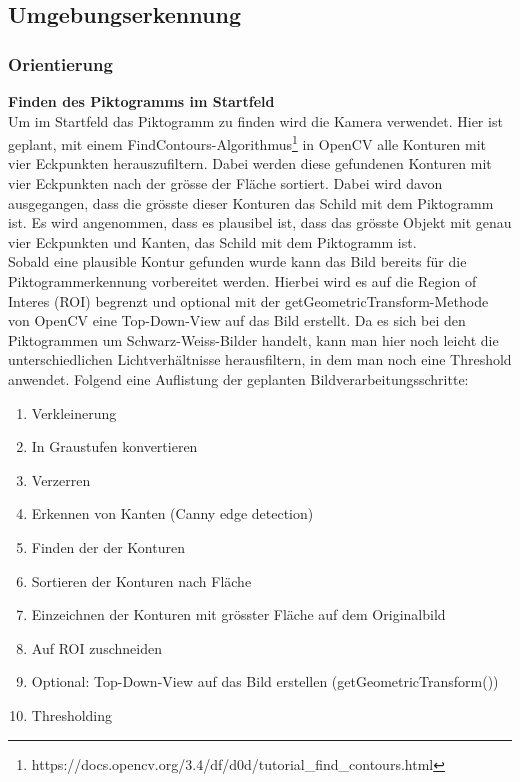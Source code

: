 \subsection{Umgebungserkennung}
\subsubsection{Orientierung}
\textbf{Finden des Piktogramms im Startfeld}\\
Um im Startfeld das Piktogramm zu finden wird die Kamera verwendet. Hier ist geplant, mit einem FindContours-Algorithmus\footnote{https://docs.opencv.org/3.4/df/d0d/tutorial\_find\_contours.html} in OpenCV alle Konturen mit vier Eckpunkten herauszufiltern. Dabei werden diese gefundenen Konturen mit vier Eckpunkten nach der grösse der Fläche sortiert. Dabei wird davon ausgegangen, dass die grösste dieser Konturen das Schild mit dem Piktogramm ist. Es wird angenommen, dass es plausibel ist, dass das grösste Objekt mit genau vier Eckpunkten und Kanten, das Schild mit dem Piktogramm ist.\\ 
Sobald eine plausible Kontur gefunden wurde kann das Bild bereits für die Piktogrammerkennung vorbereitet werden. Hierbei wird es auf die Region of Interes (ROI) begrenzt und optional mit der getGeometricTransform-Methode von OpenCV eine Top-Down-View auf das Bild erstellt. Da es sich bei den Piktogrammen um Schwarz-Weiss-Bilder handelt, kann man hier noch leicht die unterschiedlichen Lichtverhältnisse herausfiltern, in dem man noch eine Threshold anwendet.
Folgend eine Auflistung der geplanten Bildverarbeitungsschritte:
\begin{enumerate}
    \item Verkleinerung
    \item In Graustufen konvertieren 
    \item Verzerren
    \item Erkennen von Kanten (Canny edge detection)
    \item Finden der der Konturen
    \item Sortieren der Konturen nach Fläche
    \item Einzeichnen der Konturen mit grösster Fläche auf dem Originalbild
    \item Auf ROI zuschneiden
    \item Optional: Top-Down-View auf das Bild erstellen (getGeometricTransform())
    \item Thresholding
\end{enumerate}

